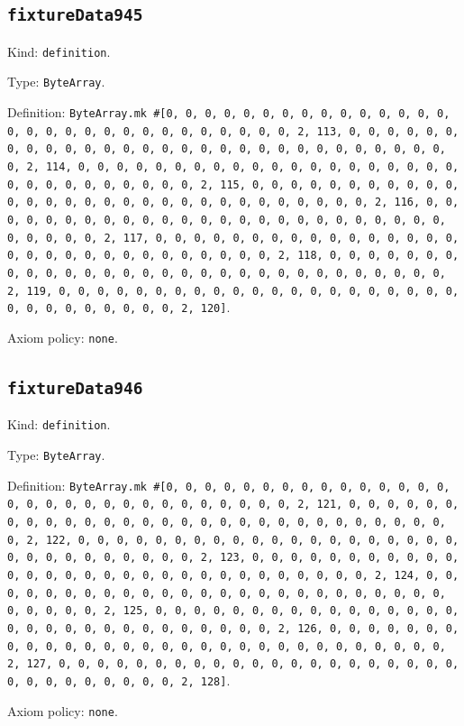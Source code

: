 \documentclass[11pt]{article}
\begin{document}
\subsection*{\texttt{fixtureData945}}
\noindent Kind: \texttt{definition}.\par
\noindent Type: \texttt{ByteArray}.\par
\noindent Definition: \texttt{ByteArray.mk \#[0, 0, 0, 0, 0, 0, 0, 0, 0, 0, 0, 0, 0, 0, 0, 0, 0, 0, 0, 0, 0, 0, 0, 0, 0, 0, 0, 0, 0, 0, 2, 113, 0, 0, 0, 0, 0, 0, 0, 0, 0, 0, 0, 0, 0, 0, 0, 0, 0, 0, 0, 0, 0, 0, 0, 0, 0, 0, 0, 0, 0, 0, 2, 114, 0, 0, 0, 0, 0, 0, 0, 0, 0, 0, 0, 0, 0, 0, 0, 0, 0, 0, 0, 0, 0, 0, 0, 0, 0, 0, 0, 0, 0, 0, 2, 115, 0, 0, 0, 0, 0, 0, 0, 0, 0, 0, 0, 0, 0, 0, 0, 0, 0, 0, 0, 0, 0, 0, 0, 0, 0, 0, 0, 0, 0, 0, 2, 116, 0, 0, 0, 0, 0, 0, 0, 0, 0, 0, 0, 0, 0, 0, 0, 0, 0, 0, 0, 0, 0, 0, 0, 0, 0, 0, 0, 0, 0, 0, 2, 117, 0, 0, 0, 0, 0, 0, 0, 0, 0, 0, 0, 0, 0, 0, 0, 0, 0, 0, 0, 0, 0, 0, 0, 0, 0, 0, 0, 0, 0, 0, 2, 118, 0, 0, 0, 0, 0, 0, 0, 0, 0, 0, 0, 0, 0, 0, 0, 0, 0, 0, 0, 0, 0, 0, 0, 0, 0, 0, 0, 0, 0, 0, 2, 119, 0, 0, 0, 0, 0, 0, 0, 0, 0, 0, 0, 0, 0, 0, 0, 0, 0, 0, 0, 0, 0, 0, 0, 0, 0, 0, 0, 0, 0, 0, 2, 120]}.\par
\noindent Axiom policy: \texttt{none}.\par
\subsection*{\texttt{fixtureData946}}
\noindent Kind: \texttt{definition}.\par
\noindent Type: \texttt{ByteArray}.\par
\noindent Definition: \texttt{ByteArray.mk \#[0, 0, 0, 0, 0, 0, 0, 0, 0, 0, 0, 0, 0, 0, 0, 0, 0, 0, 0, 0, 0, 0, 0, 0, 0, 0, 0, 0, 0, 0, 2, 121, 0, 0, 0, 0, 0, 0, 0, 0, 0, 0, 0, 0, 0, 0, 0, 0, 0, 0, 0, 0, 0, 0, 0, 0, 0, 0, 0, 0, 0, 0, 2, 122, 0, 0, 0, 0, 0, 0, 0, 0, 0, 0, 0, 0, 0, 0, 0, 0, 0, 0, 0, 0, 0, 0, 0, 0, 0, 0, 0, 0, 0, 0, 2, 123, 0, 0, 0, 0, 0, 0, 0, 0, 0, 0, 0, 0, 0, 0, 0, 0, 0, 0, 0, 0, 0, 0, 0, 0, 0, 0, 0, 0, 0, 0, 2, 124, 0, 0, 0, 0, 0, 0, 0, 0, 0, 0, 0, 0, 0, 0, 0, 0, 0, 0, 0, 0, 0, 0, 0, 0, 0, 0, 0, 0, 0, 0, 2, 125, 0, 0, 0, 0, 0, 0, 0, 0, 0, 0, 0, 0, 0, 0, 0, 0, 0, 0, 0, 0, 0, 0, 0, 0, 0, 0, 0, 0, 0, 0, 2, 126, 0, 0, 0, 0, 0, 0, 0, 0, 0, 0, 0, 0, 0, 0, 0, 0, 0, 0, 0, 0, 0, 0, 0, 0, 0, 0, 0, 0, 0, 0, 2, 127, 0, 0, 0, 0, 0, 0, 0, 0, 0, 0, 0, 0, 0, 0, 0, 0, 0, 0, 0, 0, 0, 0, 0, 0, 0, 0, 0, 0, 0, 0, 2, 128]}.\par
\noindent Axiom policy: \texttt{none}.\par
\end{document}
